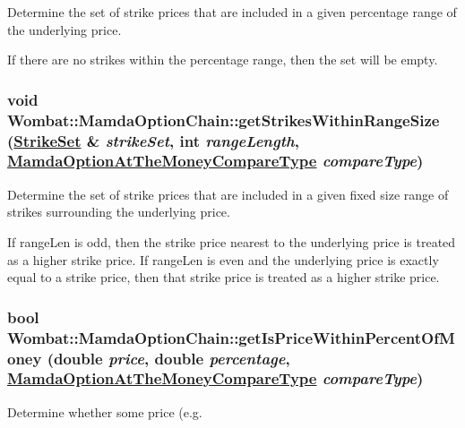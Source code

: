 Determine the set of strike prices that are included in a given percentage range of the underlying price. 

If there are no strikes within the percentage range, then the set will be empty. \hypertarget{classWombat_1_1MamdaOptionChain_e49d773a9a0767a928ef2f55b4bd6d10}{
\subsubsection[getStrikesWithinRangeSize]{\setlength{\rightskip}{0pt plus 5cm}void Wombat::Mamda\-Option\-Chain::get\-Strikes\-Within\-Range\-Size (\hyperlink{namespaceWombat_302d481a195bac5c9315c82cdbc79447}{Strike\-Set} \& {\em strike\-Set}, int {\em range\-Length}, \hyperlink{namespaceWombat_a07b06a78fb02e1f93ee37a2d944c33a}{Mamda\-Option\-At\-The\-Money\-Compare\-Type} {\em compare\-Type})}}
\label{classWombat_1_1MamdaOptionChain_e49d773a9a0767a928ef2f55b4bd6d10}


Determine the set of strike prices that are included in a given fixed size range of strikes surrounding the underlying price. 

If range\-Len is odd, then the strike price nearest to the underlying price is treated as a higher strike price. If range\-Len is even and the underlying price is exactly equal to a strike price, then that strike price is treated as a higher strike price. \hypertarget{classWombat_1_1MamdaOptionChain_f9a271be645a3afdba8e3a7d13d824ab}{
\subsubsection[getIsPriceWithinPercentOfMoney]{\setlength{\rightskip}{0pt plus 5cm}bool Wombat::Mamda\-Option\-Chain::get\-Is\-Price\-Within\-Percent\-Of\-Money (double {\em price}, double {\em percentage}, \hyperlink{namespaceWombat_a07b06a78fb02e1f93ee37a2d944c33a}{Mamda\-Option\-At\-The\-Money\-Compare\-Type} {\em compare\-Type})}}
\label{classWombat_1_1MamdaOptionChain_f9a271be645a3afdba8e3a7d13d824ab}


Determine whether some price (e.g. 

